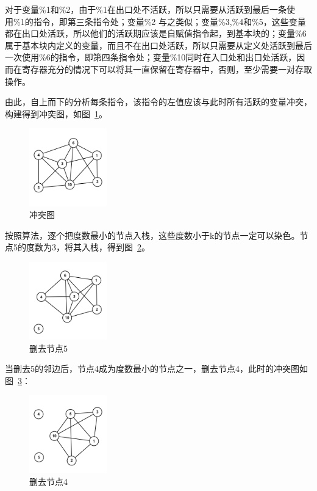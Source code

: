 对于变量\%1和\%2，由于\%1在出口处不活跃，所以只需要从活跃到最后一条使用\%1的指令，即第三条指令处；变量\%2 与之类似；变量\%3,\%4和\%5，这些变量都在出口处活跃，所以他们的活跃期应该是自赋值指令起，到基本块的；变量\%6属于基本块内定义的变量，而且不在出口处活跃，所以只需要从定义处活跃到最后一次使用\%6的指令，即第四条指令处；变量\%10同时在入口处和出口处活跃，因而在寄存器充分的情况下可以将其一直保留在寄存器中，否则，至少需要一对存取操作。

由此，自上而下的分析每条指令，该指令的左值应该与此时所有活跃的变量冲突，构建得到冲突图，如图~\ref{fig:graph0}。

\begin{figure}[htb]
  \centering
  \includegraphics[width=0.3\textwidth]{figures/graph.png}
  \caption{冲突图}
  \label{fig:graph0}
\end{figure}
按照算法，逐个把度数最小的节点入栈，这些度数小于k的节点一定可以染色。节点5的度数为3，将其入栈，得到图~\ref{fig:graph1}。

\begin{figure}[htb]
  \centering
  \includegraphics[width=0.3\textwidth]{figures/graph1.png}
  \caption{删去节点5}
  \label{fig:graph1}
\end{figure}

当删去5的邻边后，节点4成为度数最小的节点之一，删去节点4，此时的冲突图如图~\ref{fig:graph2}：

\begin{figure}[htb]
  \centering
  \includegraphics[width=0.3\textwidth]{figures/graph2.png}
  \caption{删去节点4}
  \label{fig:graph2}
\end{figure}

